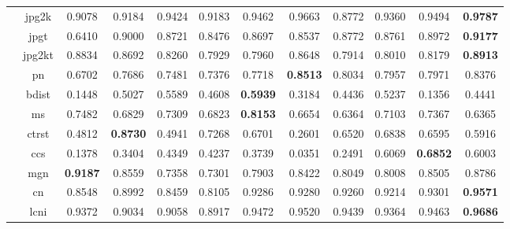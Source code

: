\documentclass[11pt,a4paper]{article}
\begin{document}
\begin{table}[!htb]
\begin{scriptsize}
\begin{threeparttable}
\begin{tabular}{*{12}{c}}
& jpg2k & \cellcolor{green!25}0.9078 & \cellcolor{green!25}0.9184 & \cellcolor{green!25}0.9424 & \cellcolor{green!25}0.9183 & \cellcolor{green!25}0.9462 & 0.9663 & \cellcolor{green!25}0.8772 & \cellcolor{green!25}0.9360 & \cellcolor{green!25}0.9494 & \textbf{0.9787}\\
& jpgt & \cellcolor{green!25}0.6410 & 0.9000 & 0.8721 & \cellcolor{green!25}0.8476 & 0.8697 & \cellcolor{green!25}0.8537 & 0.8772 & 0.8761 & 0.8972 & \textbf{0.9177}\\
& jpg2kt & 0.8834 & 0.8692 & \cellcolor{green!25}0.8260 & \cellcolor{green!25}0.7929 & \cellcolor{green!25}0.7960 & 0.8648 & \cellcolor{green!25}0.7914 & \cellcolor{green!25}0.8010 & \cellcolor{green!25}0.8179 & \textbf{0.8913}\\
& pn & \cellcolor{green!25}0.6702 & 0.7686 & 0.7481 & \cellcolor{green!25}0.7376 & 0.7718 & \textbf{0.8513} & 0.8034 & 0.7957 & 0.7971 & 0.8376\\
& bdist & \cellcolor{green!25}0.1448 & 0.5027 & 0.5589 & 0.4608 & \textbf{0.5939} & 0.3184 & 0.4436 & 0.5237 & \cellcolor{green!25}0.1356 & 0.4441\\
& ms & 0.7482 & 0.6829 & 0.7309 & 0.6823 & \cellcolor{red!25}\textbf{0.8153} & 0.6654 & 0.6364 & 0.7103 & 0.7367 & 0.6365\\
& ctrst & 0.4812 & \cellcolor{red!25}\textbf{0.8730} & 0.4941 & 0.7268 & 0.6701 & \cellcolor{green!25}0.2601 & 0.6520 & 0.6838 & 0.6595 & 0.5916\\
& ccs & \cellcolor{green!25}0.1378 & \cellcolor{green!25}0.3404 & 0.4349 & 0.4237 & \cellcolor{green!25}0.3739 & \cellcolor{green!25}0.0351 & \cellcolor{green!25}0.2491 & 0.6069 & \textbf{0.6852} & 0.6003\\
& mgn & \textbf{0.9187} & 0.8559 & \cellcolor{green!25}0.7358 & \cellcolor{green!25}0.7301 & \cellcolor{green!25}0.7903 & 0.8422 & \cellcolor{green!25}0.8049 & \cellcolor{green!25}0.8008 & 0.8505 & 0.8786\\
& cn & \cellcolor{green!25}0.8548 & \cellcolor{green!25}0.8992 & \cellcolor{green!25}0.8459 & \cellcolor{green!25}0.8105 & \cellcolor{green!25}0.9286 & \cellcolor{green!25}0.9280 & \cellcolor{green!25}0.9260 & \cellcolor{green!25}0.9214 & \cellcolor{green!25}0.9301 & \textbf{0.9571}\\
& lcni & \cellcolor{green!25}0.9372 & \cellcolor{green!25}0.9034 & \cellcolor{green!25}0.9058 & \cellcolor{green!25}0.8917 & \cellcolor{green!25}0.9472 & 0.9520 & \cellcolor{green!25}0.9439 & \cellcolor{green!25}0.9364 & \cellcolor{green!25}0.9463 & \textbf{0.9686}\\

\end{tabular}
\end{threeparttable}
\end{scriptsize}
\end{table}
\end{document}
